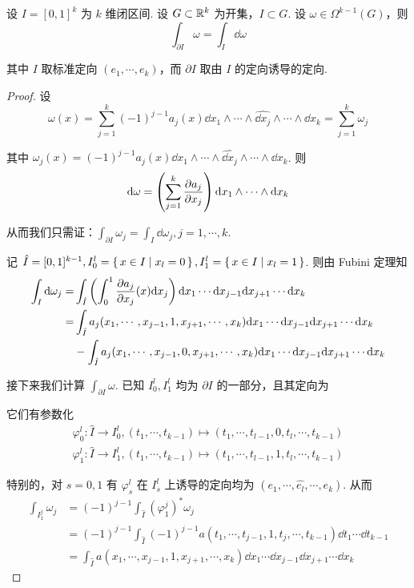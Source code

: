 

\begin{lemma}
    设 $I=[0,1]^k$ 为 $k$ 维闭区间. 设 $G\subset\mathbb{R}^k$ 为开集，$I\subset G$. 设 $\omega\in\Omega^{k-1}(G)$，则
$$
\int_{\partial I}\omega=\int_I\dd\omega
$$

    其中 $I$ 取标准定向 $(e_1,\cdots,e_k)$，而 $\partial I$ 取由 $I$ 的定向诱导的定向.
\end{lemma}
\begin{proof}
    设
$$
\omega(x)=\sum_{j=1}^k(-1)^{j-1}a_j(x)\dd x_1\wedge\cdots\wedge\widehat{\dd x_j}\wedge\cdots\wedge\dd x_k=\sum_{j=1}^k\omega_j
$$

    其中 $\omega_j(x)=(-1)^{j-1}a_j(x)\dd x_1\wedge\cdots\wedge\widehat{\dd x_j}\wedge\cdots\wedge\dd x_k$. 则
$$
\mathrm{d}\omega=\left(\sum_{j=1}^k\frac{\partial{a_j}}{\partial{x_j}}\right)\mathrm{d} x_1\wedge\cdots\wedge\mathrm{d} x_k
$$

    从而我们只需证：$\displaystyle\int_{\partial I}\omega_j=\int_I\dd\omega_j,j=1,\cdots,k$.

    记 $\hat{I}=[0,1]^{k-1},I_0^l=\set{x\in I|x_l=0},I_1^l=\set{x\in I|x_l=1}$. 则由 Fubini 定理知
$$
\begin{aligned}
    \int_I\mathrm{d}\omega_j=&\int_{\hat{I}}\left(\int_0^1\frac{\partial{a_j}}{\partial{x_j}}(x)\mathrm{d} x_j\right)\mathrm{d} x_1\cdots\mathrm{d} x_{j-1}\mathrm{d} x_{j+1}\cdots\mathrm{d} x_k\\
    =&\int_{\hat{I}}a_j(x_1,\cdots,x_{j-1},1,x_{j+1},\cdots,x_k)\mathrm{d} x_1\cdots\mathrm{d} x_{j-1}\mathrm{d} x_{j+1}\cdots\mathrm{d} x_k\\
    &-\int_{\hat{I}}a_j(x_1,\cdots,x_{j-1},0,x_{j+1},\cdots,x_k)\mathrm{d} x_1\cdots\mathrm{d} x_{j-1}\mathrm{d} x_{j+1}\cdots\mathrm{d} x_k
\end{aligned}
$$

    接下来我们计算 $\displaystyle\int_{\partial I}\omega$. 已知 $I_0^l,I_1^l$ 均为 $\partial I$ 的一部分，且其定向为


    它们有参数化
$$
\begin{aligned}
    \varphi_0^l:\hat{I}\to I_0^l,(t_1,\cdots,t_{k-1})\mapsto(t_1,\cdots,t_{l-1},0,t_l,\cdots,t_{k-1})\\
    \varphi_1^l:\hat{I}\to I_1^l,(t_1,\cdots,t_{k-1})\mapsto(t_1,\cdots,t_{l-1},1,t_l,\cdots,t_{k-1})
\end{aligned}
$$

    特别的，对 $s=0,1$ 有 $\varphi^l_{s}$ 在 $I_s^l$ 上诱导的定向均为 $(e_1,\cdots,\widehat{e_l},\cdots,e_k)$. 从而
$$
\begin{aligned}
    \int_{I_1^j}\omega_j&=(-1)^{j-1}\int_{\hat{I}}(\varphi_1^j)^*\omega_j\\
    &=(-1)^{j-1}\int_{\hat{I}}(-1)^{j-1}a(t_1,\cdots,t_{j-1},1,t_j,\cdots,t_{k-1})\dd t_1\cdots\dd t_{k-1}\\
    &=\int_{\hat{I}}a(x_1,\cdots,x_{j-1},1,x_{j+1},\cdots,x_k)\dd x_1\cdots\dd x_{j-1}\dd x_{j+1}\cdots\dd x_{k}
\end{aligned}
$$


\end{proof}
